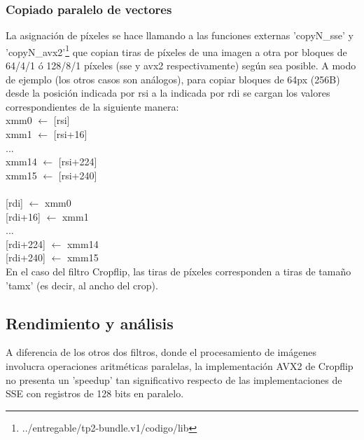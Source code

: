 \subsubsection{Copiado paralelo de vectores}
\label{explicacionCopyN}

La asignación de píxeles se hace llamando a las funciones externas 'copyN_sse' y 'copyN_avx2'\footnote{../entregable/tp2-bundle.v1/codigo/lib} que copian tiras de píxeles de una imagen a otra por bloques de 64/4/1 ó 128/8/1 píxeles (sse y avx2 respectivamente) según sea posible. A modo de ejemplo (los otros casos son análogos), para copiar bloques de 64px (256B) desde la posición indicada por rsi a la indicada por rdi se cargan los valores correspondientes de la siguiente manera:
\newline
\\
xmm0 $\leftarrow$ {[rsi]} \\
xmm1 $\leftarrow$ {[rsi+16]} \\
... \\
xmm14 $\leftarrow$ {[rsi+224]}  \\
xmm15 $\leftarrow$ {[rsi+240]} \\
\\
{[rdi]} $\leftarrow$ xmm0 \\
{[rdi+16]} $\leftarrow$ xmm1 \\
... \\
{[rdi+224]} $\leftarrow$ xmm14 \\
{[rdi+240]} $\leftarrow$ xmm15 \\

En el caso del filtro Cropflip, las tiras de píxeles corresponden a tiras de tamaño 'tamx' (es decir, al ancho del crop).  


\subsection{Rendimiento y análisis}

A diferencia de los otros dos filtros, donde el procesamiento de imágenes involucra operaciones aritméticas paralelas, la implementación AVX2 de Cropflip no presenta un 'speedup' tan significativo respecto de las implementaciones de SSE con registros de 128 bits en paralelo.

